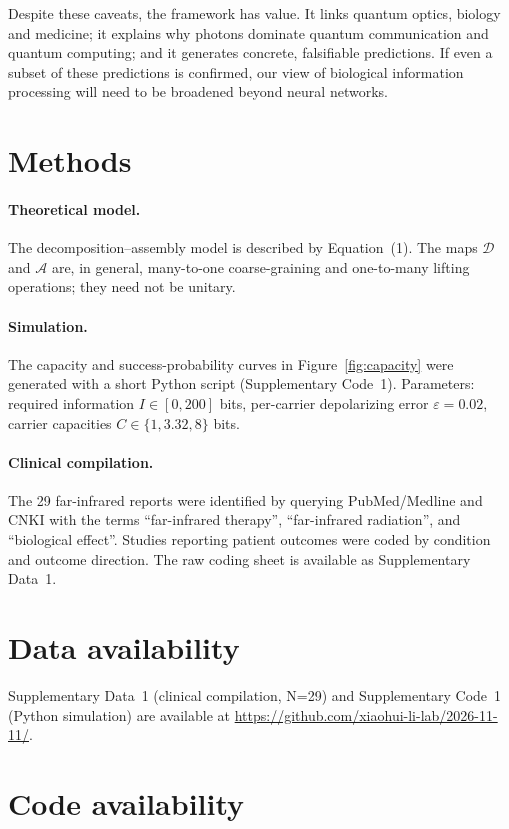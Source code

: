 \documentclass[11pt,a4paper]{article}
\begin{document}
Despite these caveats, the framework has value. It links quantum optics, biology and medicine; it explains why photons dominate quantum communication and quantum computing; and it generates concrete, falsifiable predictions. If even a subset of these predictions is confirmed, our view of biological information processing will need to be broadened beyond neural networks.

\section*{Methods}

\paragraph{Theoretical model.} The decomposition--assembly model is described by Equation~(1). The maps $\mathcal{D}$ and $\mathcal{A}$ are, in general, many-to-one coarse-graining and one-to-many lifting operations; they need not be unitary.

\paragraph{Simulation.} The capacity and success-probability curves in Figure~\ref{fig:capacity} were generated with a short Python script (Supplementary Code~1). Parameters: required information $I\in[0,200]$ bits, per-carrier depolarizing error $\varepsilon=0.02$, carrier capacities $C\in\{1, 3.32, 8\}$ bits.

\paragraph{Clinical compilation.} The 29 far-infrared reports were identified by querying PubMed/Medline and CNKI with the terms ``far-infrared therapy'', ``far-infrared radiation'', and ``biological effect''. Studies reporting patient outcomes were coded by condition and outcome direction. The raw coding sheet is available as Supplementary Data~1.

\section*{Data availability}

Supplementary Data~1 (clinical compilation, N=29) and Supplementary Code~1 (Python simulation) are available at \url{https://github.com/xiaohui-li-lab/2026-11-11/}.

\section*{Code availability}
\end{document}
